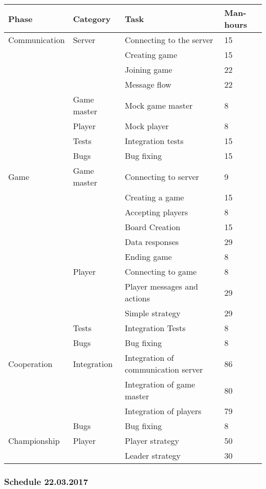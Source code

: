 \documentclass[11pt,a4paper]{article}
\begin{document}
\begin{tabular}{| p{3.5cm} | p{3cm} | p{4cm} | l |} \hline
\textbf{Phase} & \textbf{Category} & \textbf{Task} & \textbf{Man-hours} \\ \hline
Communication & Server & Connecting to the server & 15 \\ \cline{3-4}
& & Creating game & 15 \\ \cline{3-4}
& & Joining game & 22 \\ \cline{3-4}
& & Message flow & 22 \\ \cline{2-4}
& Game master & Mock game master & 8 \\ \cline{2-4}
& Player & Mock player & 8 \\ \cline{2-4}
& Tests & Integration tests & 15 \\ \cline{2-4}
& Bugs & Bug fixing & 15 \\ \hline
Game & Game master & Connecting to server & 9 \\ \cline{3-4}
& & Creating a game & 15 \\ \cline{3-4}
& & Accepting players & 8 \\ \cline{3-4}
& & Board Creation & 15 \\ \cline{3-4}
& & Data responses & 29 \\ \cline{3-4}
& & Ending game & 8 \\ \cline{2-4}
& Player & Connecting to game & 8 \\ \cline{3-4}
& & Player messages and actions & 29 \\ \cline{3-4}
& & Simple strategy & 29 \\ \cline{2-4}
& Tests & Integration Tests & 8 \\ \cline{2-4}
& Bugs & Bug fixing & 8 \\ \hline
Cooperation & Integration & Integration of communication server & 86 \\ \cline{3-4}
& & Integration of game master & 80 \\ \cline{3-4}
& & Integration of players & 79 \\ \cline{2-4}
& Bugs & Bug fixing & 8 \\ \hline
Championship & Player & Player strategy & 50 \\ \cline{3-4}
& & Leader strategy & 30 \\ \hline
\end{tabular}

\subsubsection{Schedule 22.03.2017}
\end{document}
